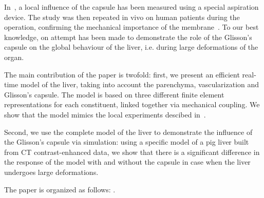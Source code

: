 \documentclass{llncs}
\def\TODO{{\color{red}{TODO}}}
\begin{document}
In~\cite{Hollenstein}, a local influence of the capsule has been measured using a special aspiration device. The study was then repeated 
in vivo on human patients during the operation, confirming the mechanical importance of the membrane~\cite{Ahn,Nava}.
To our best knowledge, on attempt has been made to demonstrate the role of the Glisson's capsule on the global behaviour of 
the liver, i.e. during large deformations of the organ.

The main contribution of the paper is twofold: first, we present an efficient real-time model of the liver, taking into account 
the parenchyma, vascularization and Glisson's capsule. The model is based on three different finite element representations for each constituent,
linked together via mechanical coupling. We show that the model mimics the local experiments descibed in~\cite{Hollenstein}.
 
Second, we use the complete model of the liver to demonstrate the influence of the Glisson's
capsule via simulation: using a specific model of a pig liver built from CT contrast-enhanced data, we show that there is a significant 
difference in the response of the model with and without the capsule in case when the liver undergoes large deformations. 

The paper is organized as follows: \TODO.
\end{document}
